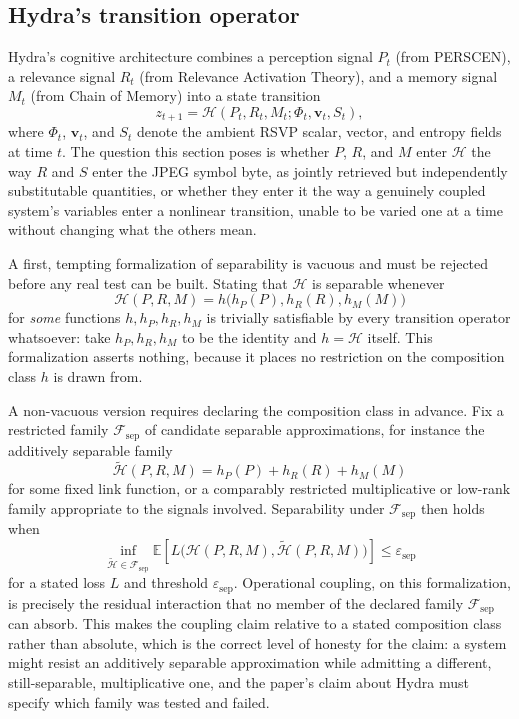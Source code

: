 \documentclass[11pt]{article}
\begin{document}
\subsection{Hydra's transition operator}

Hydra's cognitive architecture combines a perception signal $P_t$ (from PERSCEN), a relevance signal $R_t$ (from Relevance Activation Theory), and a memory signal $M_t$ (from Chain of Memory) into a state transition
\[
z_{t+1} = \mathcal{H}(P_t, R_t, M_t; \Phi_t, \mathbf{v}_t, S_t),
\]
where $\Phi_t$, $\mathbf{v}_t$, and $S_t$ denote the ambient RSVP scalar, vector, and entropy fields at time $t$. The question this section poses is whether $P$, $R$, and $M$ enter $\mathcal{H}$ the way $R$ and $S$ enter the JPEG symbol byte, as jointly retrieved but independently substitutable quantities, or whether they enter it the way a genuinely coupled system's variables enter a nonlinear transition, unable to be varied one at a time without changing what the others mean.

A first, tempting formalization of separability is vacuous and must be rejected before any real test can be built. Stating that $\mathcal{H}$ is separable whenever
\[
\mathcal{H}(P, R, M) = h\bigl(h_P(P), h_R(R), h_M(M)\bigr)
\]
for \emph{some} functions $h, h_P, h_R, h_M$ is trivially satisfiable by every transition operator whatsoever: take $h_P, h_R, h_M$ to be the identity and $h = \mathcal{H}$ itself. This formalization asserts nothing, because it places no restriction on the composition class $h$ is drawn from.

A non-vacuous version requires declaring the composition class in advance. Fix a restricted family $\mathcal{F}_{\mathrm{sep}}$ of candidate separable approximations, for instance the additively separable family
\[
\widetilde{\mathcal{H}}(P, R, M) = h_P(P) + h_R(R) + h_M(M)
\]
for some fixed link function, or a comparably restricted multiplicative or low-rank family appropriate to the signals involved. Separability under $\mathcal{F}_{\mathrm{sep}}$ then holds when
\[
\inf_{\widetilde{\mathcal{H}} \in \mathcal{F}_{\mathrm{sep}}} \mathbb{E}\left[ L\bigl( \mathcal{H}(P,R,M), \widetilde{\mathcal{H}}(P,R,M) \bigr) \right] \leq \varepsilon_{\mathrm{sep}}
\]
for a stated loss $L$ and threshold $\varepsilon_{\mathrm{sep}}$. Operational coupling, on this formalization, is precisely the residual interaction that no member of the declared family $\mathcal{F}_{\mathrm{sep}}$ can absorb. This makes the coupling claim relative to a stated composition class rather than absolute, which is the correct level of honesty for the claim: a system might resist an additively separable approximation while admitting a different, still-separable, multiplicative one, and the paper's claim about Hydra must specify which family was tested and failed.
\end{document}
